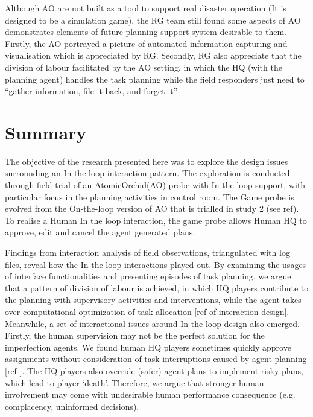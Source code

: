 Although AO are not built as a tool to support real disaster operation (It is designed to be a simulation game), the RG team still found some aspects of AO demonstrates elements of future planning support system desirable to them. Firstly, the AO portrayed a picture of automated information capturing and visualisation which is appreciated by RG. Secondly, RG also appreciate that the division of labour facilitated by the AO setting, in which the HQ (with the planning agent) handles the task planning while the field responders just need to ``gather information, file it back, and forget it''\\

\section{Summary}
The objective of the research presented here was to explore the design issues surrounding an In-the-loop interaction pattern. The exploration is conducted through field trial of an AtomicOrchid(AO) probe with In-the-loop support, with particular focus in the planning activities in control room. The Game probe is evolved from the On-the-loop version of AO that is trialled in study 2 (see ref). To realise a Human In the loop interaction, the game probe allows Human HQ to approve, edit and cancel the agent generated plans. 

Findings from interaction analysis of field observations, triangulated with log files, reveal how the In-the-loop interactions played out. By examining the usages of interface functionalities and presenting episodes of task planning, we argue that a pattern of division of labour is achieved, in which HQ players contribute to the planning with supervisory activities and interventions, while the agent takes over computational optimization of task allocation [ref of interaction design]. Meanwhile, a set of interactional issues around In-the-loop design also emerged. \\

Firstly, the human supervision may not be the perfect solution for the imperfection agents. We found human HQ players sometimes quickly approve assignments without consideration of task interruptions caused by agent planning [ref ]. The HQ players also override (safer) agent plans to implement risky plans, which lead to player `death'. Therefore, we argue that stronger human  involvement may come with undesirable human performance consequence (e.g. complacency, uninformed decisions). \\

